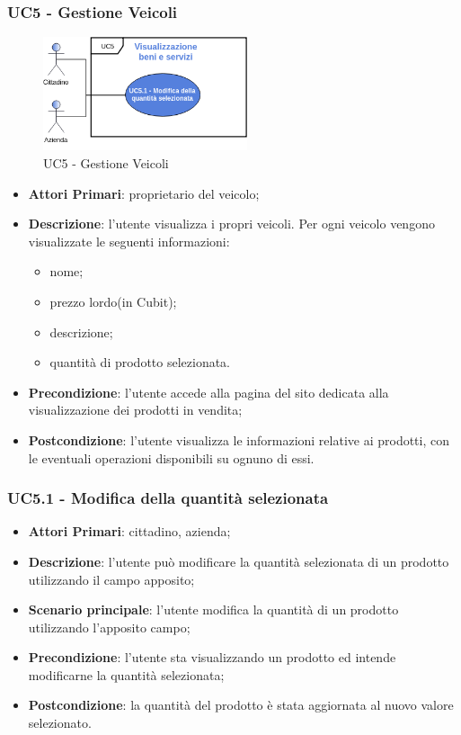  \subsubsection{UC5 - Gestione Veicoli}
  \begin{figure}[H]
 	\includegraphics[width=6cm]{res/images/UC5-Generale.png}
 	\centering
 	\caption{UC5 - Gestione Veicoli}
 \end{figure}
 \begin{itemize}
 	\item \textbf{Attori Primari}: proprietario del veicolo;
 	\item \textbf{Descrizione}: l'utente visualizza i propri veicoli. Per ogni veicolo vengono visualizzate le seguenti informazioni:
 	\begin{itemize}
 		\item nome;
 		\item prezzo lordo\glosp (in Cubit\glo);
 		\item descrizione;
 		\item quantità di prodotto selezionata.
 	\end{itemize}
 	\item \textbf{Precondizione}: l'utente accede alla pagina del sito dedicata alla visualizzazione dei prodotti in vendita;
 	\item \textbf{Postcondizione}: l'utente visualizza le informazioni relative ai prodotti, con le eventuali operazioni disponibili su ognuno di essi.
 \end{itemize}
 \subsubsection{UC5.1 - Modifica della quantità selezionata}
 \begin{itemize}
 	\item \textbf{Attori Primari}: cittadino, azienda\glo;
 	\item \textbf{Descrizione}: l'utente può modificare la quantità selezionata di un prodotto utilizzando il campo apposito;
 	\item \textbf{Scenario principale}: l'utente modifica la quantità di un prodotto utilizzando l'apposito campo;
 	\item \textbf{Precondizione}: l'utente sta visualizzando un prodotto ed intende modificarne la quantità selezionata;
 	\item \textbf{Postcondizione}: la quantità del prodotto è stata aggiornata al nuovo valore selezionato.
 \end{itemize}